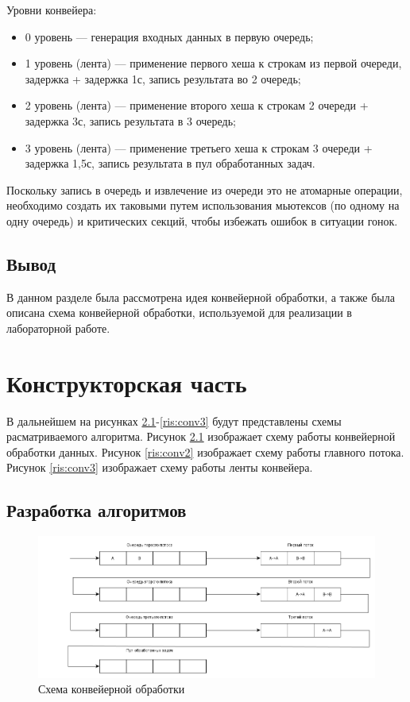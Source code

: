 \documentclass[a4paper,12pt]{report}
\begin{document}
			\vspace{0.5cm}
			Уровни конвейера:
			\begin{itemize}
				\item 0 уровень — генерация входных данных в первую очередь;
				\item 1 уровень (лента) — применение первого хеша к строкам из первой очереди, задержка + задержка 1с, запись результата во 2 очередь;
				\item 2 уровень (лента) — применение второго хеша к строкам 2 очереди + задержка 3с, запись результата в 3 очередь;
				\item 3 уровень (лента) — применение третьего хеша к строкам 3 очереди + задержка 1,5с, запись результата в пул обработанных задач.
			\end{itemize}
		
			Поскольку запись в очередь и извлечение из очереди это не атомарные операции, необходимо создать их таковыми путем использования мьютексов (по одному на одну очередь) и критических секций, чтобы избежать ошибок в ситуации гонок.
			
	\section{Вывод}

			В данном разделе была рассмотрена идея конвейерной обработки, а также была описана схема конвейерной обработки, используемой для реализации в лабораторной работе.

    \newpage

    \chapter{Конструкторская часть}
        \label{sec:construct_part}
        
			В дальнейшем на рисунках \ref{ris:conv1}-\ref{ris:conv3}  будут представлены схемы расматриваемого алгоритма.
			Рисунок \ref{ris:conv1} изображает схему работы конвейерной обработки данных.
			Рисунок \ref{ris:conv2} изображает схему работы главного потока. 
			Рисунок \ref{ris:conv3} изображает схему работы ленты конвейера.

	\section{Разработка алгоритмов}

		\begin{figure}[h!]
			\includegraphics[width=1\linewidth]{conveyor1.png}
			\caption{Схема конвейерной обработки}
			\label{ris:conv1}
		\end{figure}
	
\end{document}
